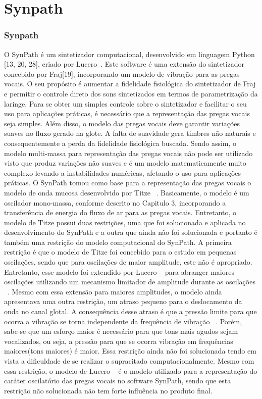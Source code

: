 \chapter{Synpath}
	\subsection{Synpath}
		O SynPath é um sintetizador computacional, desenvolvido em linguagem Python [13, 20, 28], criado por Lucero~\cite{LuceroZueiro1}. Este software é uma extensão do sintetizador concebido por Fraj[19], incorporando um modelo de vibração para as pregas vocais. O seu propósito é aumentar a ﬁdelidade ﬁsiológica do sintetizador de Fraj e permitir o controle direto dos sons sintetizados em termos de parametrização da laringe. Para se obter um simples controle sobre o sintetizador e facilitar o seu uso para aplicações práticas, é necessário que a representação das pregas vocais seja simples. Além disso, o modelo das pregas vocais deve garantir variações suaves no ﬂuxo gerado na glote. A falta de suavidade gera timbres não naturais e consequentemente a perda da ﬁdelidade ﬁsiológica buscada. Sendo assim, o modelo multi-massa para representação das pregas vocais não pode ser utilizado visto que produz variações não suaves e é um modelo matematicamente muito complexo levando a instabilidades numéricas, afetando o uso para aplicações práticas. O SynPath tomou como base para a representação das pregas vocais o modelo de onda mucosa desenvolvido por Titze ~\cite{IngoTitze}. Basicamente, o modelo é um oscilador mono-massa, conforme descrito no Capitulo 3, incorporando a transferência de energia do ﬂuxo de ar para as pregas vocais. Entretanto, o modelo de Titze possui duas restrições, uma que foi solucionada e aplicada no desenvolvimento do SynPath e a outra que ainda não foi solucionada e portanto é também uma restrição do modelo computacional do SynPath. A primeira restrição é que o modelo de Titze foi concebido para o estudo em pequenas oscilações, sendo que para oscilações de maior amplitude, este não é apropriado. Entretanto, esse modelo foi extendido por Lucero ~\cite{Lucero1} para abranger maiores oscilações utilizando um mecanismo limitador de amplitude durante as oscilações ~\cite{Lucero1}. Mesmo com essa extensão para maiores amplitudes, o modelo ainda apresentava uma outra restrição, um atraso pequeno para o deslocamento da onda no canal glotal. A consequência desse atraso é que a pressão limite para que ocorra a vibração se torna independente da frequência de vibração ~\cite{Lucero1}. Porém, sabe-se que um esforço maior é necessário para que tons mais agudos sejam vocalizados, ou seja, a pressão para que se ocorra vibração em frequências maiores(tons maiores) é maior. Essa restrição ainda não foi solucionada tendo em vista a diﬁculdade de se realizar o supracitado computacionalmente. Mesmo com essa restrição, o modelo de Lucero  ~\cite{Lucero1} é o modelo utilizado para a representação do caráter oscilatório das pregas vocais no software SynPath, sendo que esta restrição não solucionada não tem forte inﬂuência no produto ﬁnal.
		
